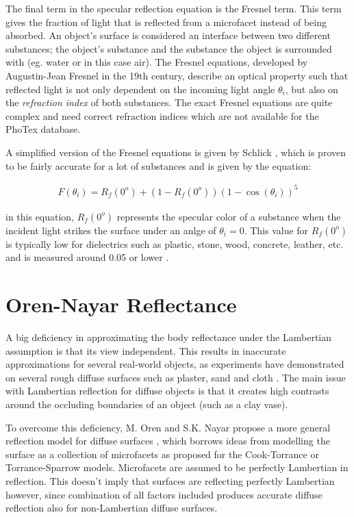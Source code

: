 The final term in the specular reflection equation is the Fresnel term. This term gives the fraction of light that is reflected from a microfacet instead of being absorbed. An object's surface is considered an interface between two different substances; the object's substance and the substance the object is surrounded with (eg. water or in this case air). The Fresnel equations, developed by Augustin-Jean Fresnel in the 19th century, describe an optical property such that reflected light is not only dependent on the incoming light angle $\theta_i$, but also on the \textit{refraction index} of both substances. The exact Fresnel equations are quite complex and need correct refraction indices which are not available for the PhoTex database. 

A simplified version of the Fresnel equations is given by Schlick \cite{Schlick}, which is proven to be fairly accurate for a lot of substances and is given by the equation:

	\begin{eqnarray*}
		F(\theta_i) = R_f(0^o) + (1 - R_f(0^o))(1 - \cos(\theta_i))^5
	\end{eqnarray*}

in this equation, $R_f(0^o)$ represents the specular color of a substance when the incident light strikes the surface under an anlge of $\theta_i = 0$. This value for $R_f(0^o)$ is typically low for dielectrics such as plastic, stone, wood, concrete, leather, etc. and is measured around 0.05 or lower \cite{RTR}. 


\section{Oren-Nayar Reflectance}\label{sec:OrenNayar}
A big deficiency in approximating the body reflectance under the Lambertian assumption is that its view independent. This results in inaccurate approximations for several real-world objects, as experiments have demonstrated on several rough diffuse surfaces such as plaster, sand and cloth \cite{OrenNayar}. The main issue with Lambertian reflection for diffuse objects is that it creates high contrasts around the occluding boundaries of an object (such as a clay vase).

To overcome this deficiency, M. Oren and S.K. Nayar propose a more general reflection model for diffuse surfaces \cite{OrenNayar}, which borrows ideas from modelling the surface as a collection of microfacets as proposed for the Cook-Torrance or Torrance-Sparrow models. Microfacets are assumed to be perfectly Lambertian in reflection. This doesn't imply that surfaces are reflecting perfectly Lambertian however, since combination of all factors included produces accurate diffuse reflection also for non-Lambertian diffuse surfaces.

